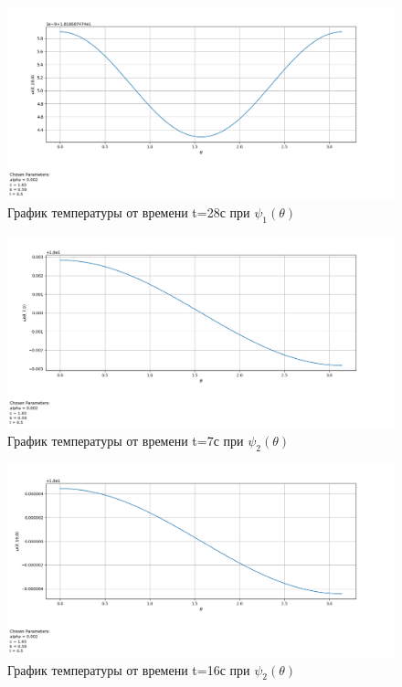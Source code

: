 {{\begin{figure}[H]
    \centering                             
	\includegraphics[width=\textwidth,height=\textheight,keepaspectratio]{kir/var_1_t_28.png}                 
	\caption{ График температуры от времени t=28с при $\psi_1(\theta)$}
	\label{grapics3}                           
\end{figure}              
\begin{figure}[H]
    \centering                             
	\includegraphics[width=\textwidth,height=\textheight,keepaspectratio]{pos/var_2_t_7.png}                 
	\caption{ График температуры от времени t=7с при $\psi_2(\theta)$}
	\label{grapics4}                           
\end{figure}               

\begin{figure}[H]
    \centering                             
	\includegraphics[width=\textwidth,height=\textheight,keepaspectratio]{pos/var_2_t_16.png}                 
	\caption{ График температуры от времени t=16с при $\psi_2(\theta)$}
	\label{grapics5}                           
\end{figure}                                  

}}
